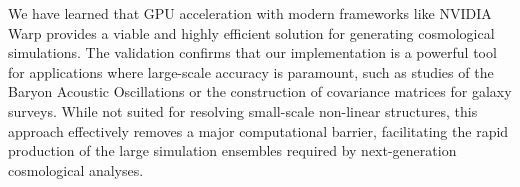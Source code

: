 \documentclass[]{article}
\begin{document}
We have learned that GPU acceleration with modern frameworks like NVIDIA Warp provides a viable and highly efficient solution for generating cosmological simulations. The validation confirms that our implementation is a powerful tool for applications where large-scale accuracy is paramount, such as studies of the Baryon Acoustic Oscillations or the construction of covariance matrices for galaxy surveys. While not suited for resolving small-scale non-linear structures, this approach effectively removes a major computational barrier, facilitating the rapid production of the large simulation ensembles required by next-generation cosmological analyses.


{}

\end{document}
